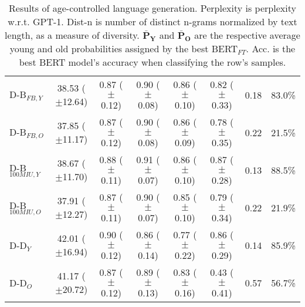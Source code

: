 \begin{table*}[h]
\begin{tabular}{l | c c c c | c c c}
    D-B$_{FB,Y}$ & 38.53 ($\pm$12.64) & 0.87 ($\pm$0.12) & 0.90 ($\pm$0.08) & 0.86 ($\pm$0.10) & 0.82 ($\pm$0.33) & 0.18 & 83.0\%\\
    D-B$_{FB,O}$ & 37.85 ($\pm$11.17) & 0.87 ($\pm$0.12) & 0.90 ($\pm$0.08) & 0.86 ($\pm$0.09) & 0.78 ($\pm$0.35) & 0.22 & 21.5\%\\
    D-B$_{100MIU,Y}$ & 38.67 ($\pm$11.70) & 0.88 ($\pm$0.11) & 0.91 ($\pm$0.07) & 0.86 ($\pm$0.10) & 0.87 ($\pm$0.28) & 0.13 & 88.5\%\\
    D-B$_{100MIU,O}$ & 37.91 ($\pm$12.27) & 0.87 ($\pm$0.11) & 0.90 ($\pm$0.07) & 0.85 ($\pm$0.10) & 0.79 ($\pm$0.34) & 0.22 & 21.9\%\\
    \midrule
    D-D$_{Y}$ & 42.01 ($\pm$16.94) & 0.90 ($\pm$0.12) & 0.86 ($\pm$0.14) & 0.77 ($\pm$0.22) & 0.86 ($\pm$0.29) & 0.14 & 85.9\%\\
    D-D$_{O}$ & 41.17 ($\pm$20.72) & 0.87 ($\pm$0.12) & 0.89 ($\pm$0.13) & 0.83 ($\pm$0.16) & 0.43 ($\pm$0.41) & 0.57 & 56.7\%\\
    \bottomrule
    \end{tabular}
    \caption{ Results of age-controlled language generation. Perplexity is perplexity w.r.t. GPT-1. Dist-n is number of distinct n-grams normalized by text length, as a measure of diversity. $\boldsymbol{\bar{P}_Y}$ and $\boldsymbol{\bar{P}_O}$ are the respective average young and old probabilities assigned by the best BERT$_{FT}$. Acc. is the best BERT model's accuracy when classifying the row's samples.}
    \label{tab:ctg_results_ws_neutral_prompt}
\end{table*}

